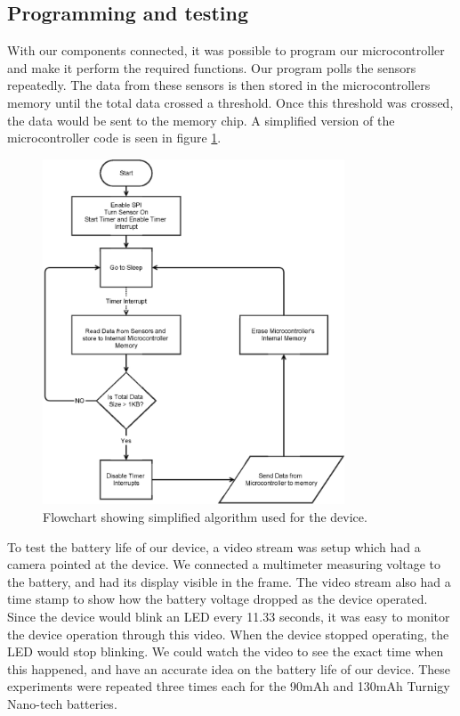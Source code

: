 \subsection{Programming and testing}
\label{Sec:Programming}
With our components connected,
it was possible to program our microcontroller and make it perform the required functions.
Our program polls the sensors repeatedly.
The data from these sensors is then stored in the microcontrollers memory until the total data crossed a threshold.
Once this threshold was crossed, the data would be sent to the memory chip.
A simplified version of the microcontroller code is seen in figure \ref{Fig:MainAlgo}.
\begin{figure}
\begin{center}
\includegraphics[width=0.8\textwidth]{images/MainAlgo.eps}
\caption{Flowchart showing simplified algorithm used for the device.}
\label{Fig:MainAlgo}
\end{center}
\end{figure}
To test the battery life of our device,
a video stream was setup which had a camera pointed at the device.
We connected a multimeter measuring voltage to the battery,
and had its display visible in the frame.
The video stream also had a time stamp to show how the battery voltage dropped as the device operated.
Since the device would blink an LED every 11.33 seconds,
it was easy to monitor the device operation through this video.
When the device stopped operating,
the LED would stop blinking.
We could watch the video to see the exact time when this happened,
and have an accurate idea on the battery life of our device.
These experiments were repeated three times each for the 90mAh and 130mAh Turnigy Nano-tech batteries.

